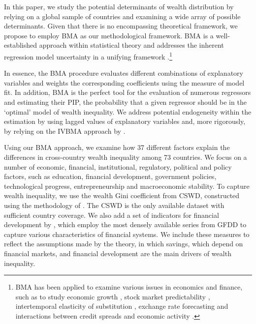 \begin{refsection}
In this paper, we study the potential determinants of wealth distribution by relying on a global sample of countries and examining a wide array of possible determinants. Given that there is no encompassing theoretical framework, we propose to employ \ac{BMA} as our methodological framework. \ac{BMA} is a well-established approach within statistical theory and addresses the inherent regression model uncertainty in a unifying framework \parencite{Koopetal2007,Rafteryetal1997}.\footnote{\ac{BMA} has been applied to examine various issues in economics and finance, such as to study economic growth \parencite{Durlaufetal2008,Fernandezetal2001}, stock market predictability  \parencite{avramov,cremers}, intertemporal elasticity of substitution \parencite{Havraneketal2015}, exchange rate forecasting \parencite{wright} and interactions between credit spreads and economic activity \parencite{faust2013}.} 


In essence, the \ac{BMA} procedure evaluates different combinations of explanatory variables and weights the corresponding coefficients using the measure of model fit. In addition, \ac{BMA} is the perfect tool for the evaluation of numerous regressors and estimating their \ac{PIP}, the probability that a given regressor should be in the `optimal' model of wealth inequality. We address potential endogeneity within the estimation by using lagged values of explanatory variables and, more rigorously, by relying on the \ac{IVBMA} approach by \textcite{KarlLenkoski2012}.

Using our \ac{BMA} approach, we examine how 37 different factors explain the differences in cross-country wealth inequality among 73 countries. We focus on a number of economic, financial, institutional, regulatory, political and policy factors, such as education, financial development, government policies, technological progress, entrepreneurship and macroeconomic stability. To capture wealth inequality, we use the wealth Gini coefficient from \ac{CSWD}, constructed using the methodology of \textcite{daviesetal2017}. The \ac{CSWD} is the only available dataset with sufficient country coverage. We also add a set of indicators for financial development by \textcite{svirydzenka2016introducing}, which employ the most densely available series from \ac{GFDD} to capture various characteristics of financial systems. We include these measures to reflect the assumptions made by the theory, in which savings, which depend on financial markets, and financial development are the main drivers of wealth inequality.


\end{refsection}
